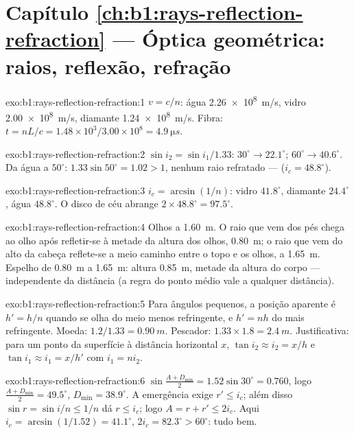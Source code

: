 \section*{Capítulo \ref{ch:b1:rays-reflection-refraction} --- Óptica geométrica: raios, reflexão, refração}

\begin{solution}{exo:b1:rays-reflection-refraction:1}
$v = c/n$: água \qty{2.26e8}{m/s}, vidro \qty{2.00e8}{m/s}, diamante
\qty{1.24e8}{m/s}. Fibra: $t = nL/c = 1.48 \times 10^3/3.00\times10^8 =
\qty{4.9}{\micro s}$.
\end{solution}

\begin{solution}{exo:b1:rays-reflection-refraction:2}
$\sin i_2 = \sin i_1/1.33$: $30^\circ \to 22.1^\circ$; $60^\circ \to
40.6^\circ$. Da água a $50^\circ$: $1.33\sin 50^\circ = 1.02 > 1$,
nenhum raio refratado ---  ($i_c = 48.8^\circ$).
\end{solution}

\begin{solution}{exo:b1:rays-reflection-refraction:3}
$i_c = \arcsin(1/n)$: vidro $41.8^\circ$, diamante $24.4^\circ$, água
$48.8^\circ$. O disco de céu abrange $2 \times 48.8^\circ = 97.5^\circ$.
\end{solution}

\begin{solution}{exo:b1:rays-reflection-refraction:4}
Olhos a \qty{1.60}{m}. O raio que vem dos pés chega ao olho após
refletir-se à metade da altura dos olhos, \qty{0.80}{m}; o raio que vem do alto
da cabeça reflete-se a meio caminho entre o topo e os olhos, a \qty{1.65}{m}.
Espelho de \qty{0.80}{m} a \qty{1.65}{m}: altura \qty{0.85}{m}, metade
da altura do corpo --- independente da distância (a regra do ponto médio
vale a qualquer distância).
\end{solution}

\begin{solution}{exo:b1:rays-reflection-refraction:5}
Para ângulos pequenos, a posição aparente é $h' = h/n$ quando se olha do
meio menos refringente, e $h' = nh$ do mais refringente. Moeda: $1.2/1.33 =
\qty{0.90}{m}$. Pescador: $1.33 \times 1.8 = \qty{2.4}{m}$. Justificativa:
para um ponto da superfície à distância horizontal $x$, $\tan i_2 \approx i_2 =
x/h$ e $\tan i_1 \approx i_1 = x/h'$ com $i_1 = n i_2$.
\end{solution}

\begin{solution}{exo:b1:rays-reflection-refraction:6}
$\sin\frac{A + D_{\min}}{2} = 1.52\sin 30^\circ = 0.760$, logo
$\frac{A + D_{\min}}{2} = 49.5^\circ$, $D_{\min} = 38.9^\circ$.
A emergência exige $r' \leq i_c$; além disso $\sin r = \sin i/n \leq 1/n$ dá
$r \leq i_c$; logo $A = r + r' \leq 2i_c$. Aqui $i_c = \arcsin(1/1.52) =
41.1^\circ$, $2i_c = 82.3^\circ > 60^\circ$: tudo bem.
\end{solution}

